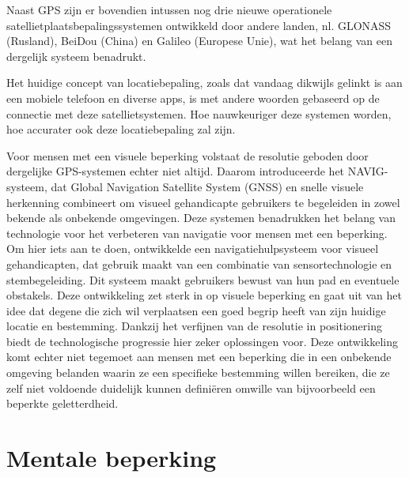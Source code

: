Naast GPS zijn er bovendien intussen nog drie nieuwe operationele satellietplaatsbepalingssystemen ontwikkeld door andere landen, nl. GLONASS (Rusland), BeiDou (China) en Galileo (Europese Unie), wat het belang van een dergelijk systeem benadrukt.

Het huidige concept van locatiebepaling, zoals dat vandaag dikwijls gelinkt is aan een mobiele telefoon en diverse apps, is met andere woorden gebaseerd op de connectie met deze satellietsystemen. Hoe nauwkeuriger deze systemen worden, hoe accurater ook deze locatiebepaling zal zijn.

Voor mensen met een visuele beperking volstaat de resolutie geboden door dergelijke GPS-systemen echter niet altijd. Daarom introduceerde \textcite{Katz2010} het NAVIG-systeem, dat Global Navigation Satellite System (GNSS) en snelle visuele herkenning combineert om visueel gehandicapte gebruikers te begeleiden in zowel bekende als onbekende omgevingen. Deze systemen benadrukken het belang van technologie voor het verbeteren van navigatie voor mensen met een beperking. Om hier iets aan te doen, ontwikkelde  
\textcite{Lakde2015} een navigatiehulpsysteem voor visueel gehandicapten, dat gebruik maakt van een combinatie van sensortechnologie en stembegeleiding. Dit systeem maakt gebruikers bewust van hun pad en eventuele obstakels. Deze ontwikkeling zet sterk in op visuele beperking en gaat uit van het idee dat degene die zich wil verplaatsen een goed begrip heeft van zijn huidige locatie en bestemming. Dankzij het verfijnen van de resolutie in positionering biedt de technologische progressie hier zeker oplossingen voor. Deze ontwikkeling komt echter niet tegemoet aan mensen met een beperking die in een onbekende omgeving belanden waarin ze een specifieke bestemming willen bereiken, die ze zelf niet voldoende duidelijk kunnen definiëren omwille van bijvoorbeeld een beperkte geletterdheid.

\section{Mentale beperking}
\label{sec:mentale-beperking}

